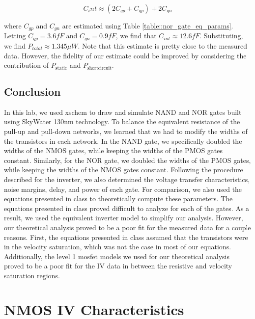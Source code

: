 \documentclass{article}
\begin{document}
	 \begin{equation}
	 	\label{eq::cint_est}
	 	C_int \approx (2C_{gp} + C_{gp}) + 2C_{gn}
	 \end{equation}
	 
	  \noindent where $C_{gp}$ and $C_{gn}$ are estimated using Table \ref{table::nor_gate_eq_params}. Letting $C_{gp} = 3.6 fF$ and $C_{gn} = 0.9 fF$, we find that $C_{int} \approx 12.6 fF$. Substituting, we find $P_{total} \approx 1.345 {\mu}W$. Note that this estimate is pretty close to the measured data. However, the fidelity of our estimate could be improved by considering the contribution of $P_{\text{static}}$ and $P_{\text{shortcircuit}}$.
	
	\subsection{Conclusion}
	
	In this lab, we used xschem to draw and simulate NAND and NOR gates built using SkyWater 130nm technology. To balance the equivalent resistance of the pull-up and pull-down networks, we learned that we had to modify the widths of the transistors in each network. In the NAND gate, we specifically doubled the widths of the NMOS gates, while keeping the widths of the PMOS gates constant. Similarly, for the NOR gate, we doubled the widths of the PMOS gates, while keeping the widths of the NMOS gates constant. Following the procedure described for the inverter, we also determined the voltage transfer characteristics, noise margins, delay, and power of each gate. For comparison, we also used the equations presented in class to theoretically compute these parameters. The equations presented in class proved difficult to analyze for each of the gates. As a result, we used the equivalent inverter model to simplify our analysis. However, our theoretical analysis proved to be a poor fit for the measured data for a couple reasons. First, the equations presented in class assumed that the transistors were in the velocity saturation, which was not the case in most of our equations. Additionally, the level 1 mosfet models we used for our theoretical analysis proved to be a poor fit for the IV data in between the resistive and velocity saturation regions.
	
	
	
	\pagebreak
	\appendix
	\section{NMOS IV Characteristics}
	\label{appendix::nmos_iv_characteristics}
	
\end{document}

